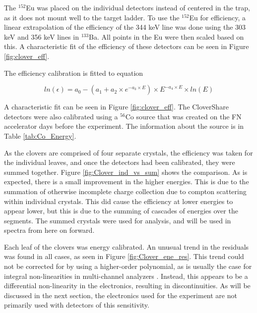 

The $^{152}$Eu was placed on the individual detectors instead of centered in the trap, as it does not mount well to the target ladder. To use the $^{152}$Eu for efficiency, a linear extrapolation of the efficiency of the 344 keV line was done using the 303 keV and 356 keV lines in $^{133}$Ba. All points in the Eu were then scaled based on this. A characteristic fit of the efficiency of these detectors can be seen in Figure \ref{fig:clover_eff}.

The efficiency calibration is fitted to equation

\begin{equation}
    ln(\epsilon) = a_0-(a_1+a_2\times e^{-a_3\times E})\times E^{-a_4\times E}\times ln(E)
    \label{eq:Ge_Eff}
\end{equation}

A characteristic fit can be seen in Figure \ref{fig:clover_eff}. The CloverShare detectors were also calibrated using a $^{56}$Co source that was created on the FN accelerator days before the experiment. The information about the source is in Table \ref{tab:Co_Energy}. 





As the clovers are comprised of four separate crystals, the efficiency was taken for the individual leaves, and once the detectors had been calibrated, they were summed together. Figure \ref{fig:Clover_ind_vs_sum} shows the comparison. As is expected, there is a small improvement in the higher energies. This is due to the summation of otherwise incomplete charge collection due to compton scattering within individual crystals. This did cause the efficiency at lower energies to appear lower, but this is due to the summing of cascades of energies over the segments. The summed crystals were used for analysis, and will be used in spectra from here on forward.



Each leaf of the clovers was energy calibrated. An unusual trend in the residuals was found in all cases, as seen in Figure \ref{fig:Clover_ene_res}. This trend could not be corrected for by using a higher-order polynomial, as is usually the case for integral non-linearities in multi-channel analyzers \citep{knoll00:rad_det_meas}. Instead, this appears to be a differential non-linearity in the electronics, resulting in discontinuities. As will be discussed in the next section, the electronics used for the experiment are not primarily used with detectors of this sensitivity.

